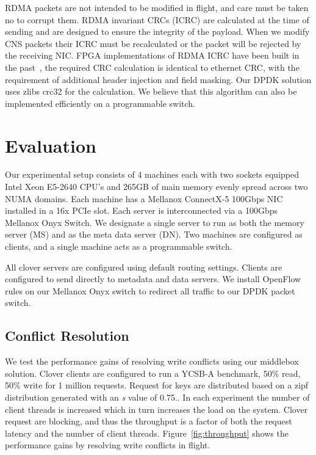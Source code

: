 RDMA packets are not intended to be modified in flight, and care must
be taken no to corrupt them. RDMA invariant CRCs (ICRC) are calculated
at the time of sending and are designed to ensure the integrity of the
payload. When we modify CNS packets their ICRC must be recalculated or
the packet will be rejected by the receiving NIC. FPGA implementations
of RDMA ICRC have been built in the past~\cite{Mansour_2019}, the
required CRC calculation is identical to ethernet CRC, with the
requirement of additional header injection and field masking. Our DPDK
solution uses zlibs crc32 for the calculation. We believe that this
algorithm can also be implemented efficiently on a programmable
switch.

\section{Evaluation}

Our experimental setup consists of 4 machines each with two sockets
equipped Intel Xeon E5-2640 CPU's and 265GB of main memory evenly
spread across two NUMA domains. Each machine has a Mellanox ConnectX-5
100Gbps NIC installed in a 16x PCIe slot. Each server is
interconnected via a 100Gbps Mellanox Onyx Switch. We designate a
single server to run as both the memory server (MS) and as the meta
data server (DN). Two machines are configured as clients, and a single
machine acts as a programmable switch.

All clover servers are configured using default routing settings.
Clients are configured to send directly to metadata and data servers.
We install OpenFlow rules on our Mellanox Onyx switch to redirect all
traffic to our DPDK packet switch.

\subsection{Conflict Resolution}

We test the performance gains of resolving write conflicts using our
middlebox solution. Clover clients are configured to run a YCSB-A
benchmark, 50\% read, 50\% write for 1 million requests. Request for
keys are distributed based on a zipf distribution generated with an
\textit{s} value of 0.75.. In each
experiment the number of client threads is increased which in turn
increases the load on the system. Clover request are blocking, and
thus the throughput is a factor of both the request latency and the
number of client threads. Figure~\ref{fig:throughput} shows the
performance gains by resolving write conflicts in flight.

